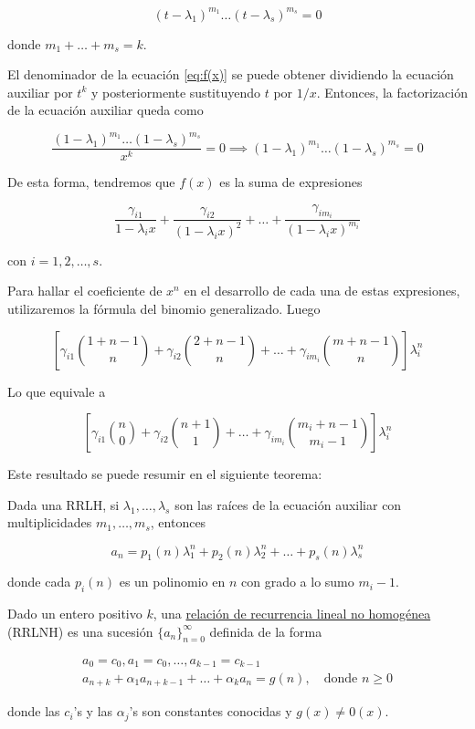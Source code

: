 \[
(t- \lambda_1)^{m_1}\dots(t- \lambda_s)^{m_s} = 0
\]

\noindent donde $m_1 + \dots + m_s = k$.

El denominador de la ecuación \ref{eq:f(x)} se puede obtener dividiendo la ecuación auxiliar por $t^k$ y posteriormente sustituyendo $t$ por $1/x$. Entonces, la factorización de la ecuación auxiliar queda como

\[
\frac{(1- \lambda_1)^{m_1}\dots(1- \lambda_s)^{m_s}}{x^k} = 0 \implies (1- \lambda_1)^{m_1}\dots(1- \lambda_s)^{m_s} = 0
\]

De esta forma, tendremos que $f(x)$ es la suma de expresiones

\[
\frac{\gamma_{i1}}{1 - \lambda_ix} + \frac{\gamma_{i2}}{(1 - \lambda_ix)^2} + \dots + \frac{\gamma_{im_i}}{(1 - \lambda_ix)^{m_i}}
\]

\noindent con $i = 1, 2, \dots, s$.

Para hallar el coeficiente de $x^n$ en el desarrollo de cada una de estas expresiones, utilizaremos la fórmula del binomio generalizado. Luego

\[
\left[ \gamma_{i1} \binom{1+n-1}{n} + \gamma_{i2} \binom{2+n-1}{n} + \dots + \gamma_{im_i} \binom{m+n-1}{n} \right]\lambda_i^n
\]

Lo que equivale a

\[
\left[ \gamma_{i1} \binom{n}{0} + \gamma_{i2} \binom{n+1}{1} + \dots + \gamma_{im_i} \binom{m_i + n - 1}{m_i - 1} \right] \lambda_i^n
\]

Este resultado se puede resumir en el siguiente teorema:

\begin{teo}
    Dada una RRLH, si $\lambda_1, \dots, \lambda_s$ son las raíces de la ecuación auxiliar con multiplicidades $m_1, \dots, m_s$, entonces
    
    \[
    a_n = p_1(n)\lambda_1^n + p_2(n)\lambda_2^n + \dots + p_s(n)\lambda_s^n
    \]
    
    \noindent donde cada $p_i(n)$ es un polinomio en $n$ con grado a lo sumo $m_i - 1$.
\end{teo}

\begin{defn}
    Dado un entero positivo $k$, una \ul{relación de recurrencia lineal no homogénea} (RRLNH) es una sucesión $\{a_n\}_{n=0}^{\infty}$ definida de la forma
    
    \begin{gather*}
        a_0 = c_0, a_1 = c_0, \dots, a_{k-1} = c_{k-1} \\
        a_{n+k} + \alpha_1a_{n+k-1} + \dots + \alpha_ka_{n} = g(n), \quad \text{donde $n \geq 0$}
    \end{gather*}
    
    \noindent donde las $c_i$'s y las $\alpha_j$'s son constantes conocidas y $g(x) \neq 0(x)$.
\end{defn}